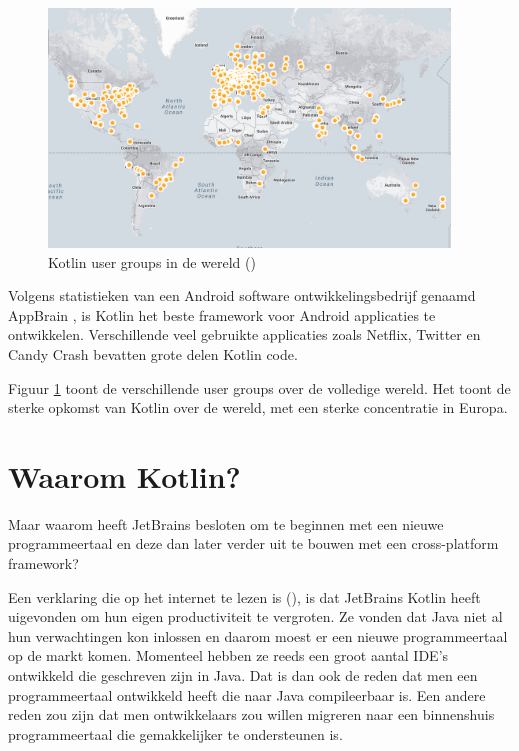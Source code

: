 \begin{figure} [ht]
	\centering
	\includegraphics[width=0.95\textwidth]{img/KUGmap.png}
	\caption{Kotlin user groups in de wereld (\cite{JetBrains12})}
	\label{fig:usergroups}
\end{figure}

Volgens statistieken van een Android software ontwikkelingsbedrijf genaamd AppBrain \autocite{AppBrain}, is Kotlin het beste framework voor Android applicaties te ontwikkelen. Verschillende veel gebruikte applicaties zoals Netflix, Twitter en Candy Crash bevatten grote delen Kotlin code.

Figuur \ref{fig:usergroups} toont de verschillende user groups over de volledige wereld. Het toont de sterke opkomst van Kotlin over de wereld, met een sterke concentratie in Europa.

\section{Waarom Kotlin?}
\label{sec:whykotlin}
Maar waarom heeft JetBrains besloten om te beginnen met een nieuwe programmeertaal en deze dan later verder uit te bouwen met een cross-platform framework?

Een verklaring die op het internet te lezen is (\cite{TechYourChance}), is dat JetBrains Kotlin heeft uigevonden om hun eigen productiviteit te vergroten. Ze vonden dat Java niet al hun verwachtingen kon inlossen en daarom moest er een nieuwe programmeertaal op de markt komen. Momenteel hebben ze reeds een groot aantal IDE's ontwikkeld die geschreven zijn in Java. Dat is dan ook de reden dat men een programmeertaal ontwikkeld heeft die naar Java compileerbaar is. Een andere reden zou zijn dat men ontwikkelaars zou willen migreren naar een binnenshuis programmeertaal die gemakkelijker te ondersteunen is.

